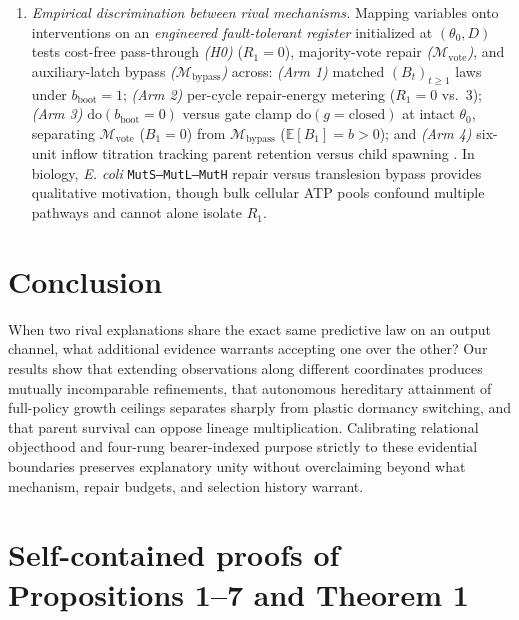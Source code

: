 \documentclass[11pt,letterpaper]{article}
\begin{document}
\begin{enumerate}
\item
  \emph{Empirical discrimination between rival mechanisms.} Mapping
  variables onto interventions \citep{craver2007, rubenstein2017} on an
  \emph{engineered fault-tolerant register} initialized at
  \((\theta_0, D)\) tests cost-free pass-through \emph{(H0)}
  (\(R_1=0\)), majority-vote repair
  \emph{(\(\mathcal{M}_{\mathrm{vote}}\))}, and auxiliary-latch bypass
  \emph{(\(\mathcal{M}_{\mathrm{bypass}}\))} across: \emph{(Arm 1)}
  matched \((B_t)_{t\ge 1}\) laws under \(b_{\mathrm{boot}}=1\);
  \emph{(Arm 2)} per-cycle repair-energy metering (\(R_1=0\) vs.~\(3\));
  \emph{(Arm 3)} \(\mathrm{do}(b_{\mathrm{boot}}=0)\) versus gate clamp
  \(\mathrm{do}(g=\mathrm{closed})\) at intact \(\theta_0\), separating
  \(\mathcal{M}_{\mathrm{vote}}\) (\(B_1=0\)) from
  \(\mathcal{M}_{\mathrm{bypass}}\) (\(\mathbb{E}[B_1]=b>0\)); and
  \emph{(Arm 4)} six-unit inflow titration tracking parent retention
  versus child spawning \citep{mayo2018}. In biology, \emph{E. coli}
  \texttt{MutS–MutL–MutH} repair versus translesion bypass
  \citep{auWelshModrich1992, hasanLeach2015} provides qualitative
  motivation, though bulk cellular ATP pools confound multiple pathways
  and cannot alone isolate \(R_1\).
\end{enumerate}

\section{Conclusion}\label{conclusion}

When two rival explanations share the exact same predictive law on an
output channel, what additional evidence warrants accepting one over the
other? Our results show that extending observations along different
coordinates produces mutually incomparable refinements, that autonomous
hereditary attainment of full-policy growth ceilings separates sharply
from plastic dormancy switching, and that parent survival can oppose
lineage multiplication. Calibrating relational objecthood and four-rung
bearer-indexed purpose strictly to these evidential boundaries preserves
explanatory unity without overclaiming beyond what mechanism, repair
budgets, and selection history warrant.

\appendix

\section{Self-contained proofs of Propositions 1--7 and Theorem
1}\label{self-contained-proofs-of-propositions-17-and-theorem-1}
\end{document}
